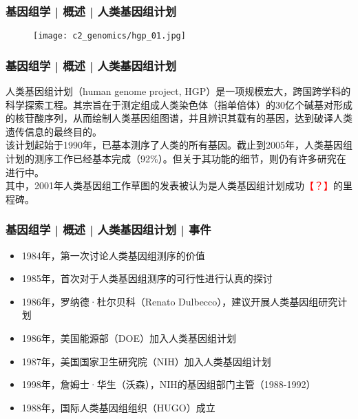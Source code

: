 \begin{frame}
  \frametitle{基因组学 | 概述 | 人类基因组计划}
  \begin{figure}
    \centering
    \texttt{[image: c2\_genomics/hgp\_01.jpg]}
  \end{figure}
\end{frame}

\begin{frame}
  \frametitle{基因组学 | 概述 | 人类基因组计划}
人类基因组计划（human genome project, HGP）是一项规模宏大，跨国跨学科的科学探索工程。其宗旨在于测定组成人类染色体（指单倍体）的30亿个碱基对形成的核苷酸序列，从而绘制人类基因组图谱，并且辨识其载有的基因，达到破译人类遗传信息的最终目的。\\
\vspace{1em}
该计划起始于1990年，已基本测序了人类的所有基因。截止到2005年，人类基因组计划的测序工作已经基本完成（92\%）。但关于其功能的细节，则仍有许多研究在进行中。\\
\vspace{1em}
其中，2001年人类基因组工作草图的发表被认为是人类基因组计划成功\textcolor{red}{【？】}的里程碑。
\end{frame}

\begin{frame}
  \frametitle{基因组学 | 概述 | 人类基因组计划 | 事件}
  \begin{itemize}[<+->]
    \item 1984年，第一次讨论人类基因组测序的价值
    \item 1985年，首次对于人类基因组测序的可行性进行认真的探讨
    \item 1986年，罗纳德·杜尔贝科（Renato Dulbecco），建议开展人类基因组研究计划
    \item 1986年，美国能源部（DOE）加入人类基因组计划
    \item 1987年，美国国家卫生研究院（NIH）加入人类基因组计划
    \item 1998年，詹姆士·华生（沃森），NIH的基因组部门主管（1988-1992）
    \item 1988年，国际人类基因组组织（HUGO）成立
  \end{itemize}
\end{frame}

